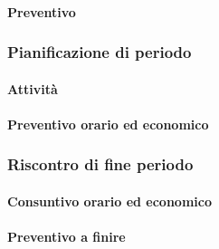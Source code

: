 \paragraph{Preventivo}

\subsubsection{Pianificazione di periodo}




\paragraph{Attività}


\paragraph{Preventivo orario ed economico}



\subsubsection{Riscontro di fine periodo}


\paragraph{Consuntivo orario ed economico}


\paragraph{Preventivo a finire}
